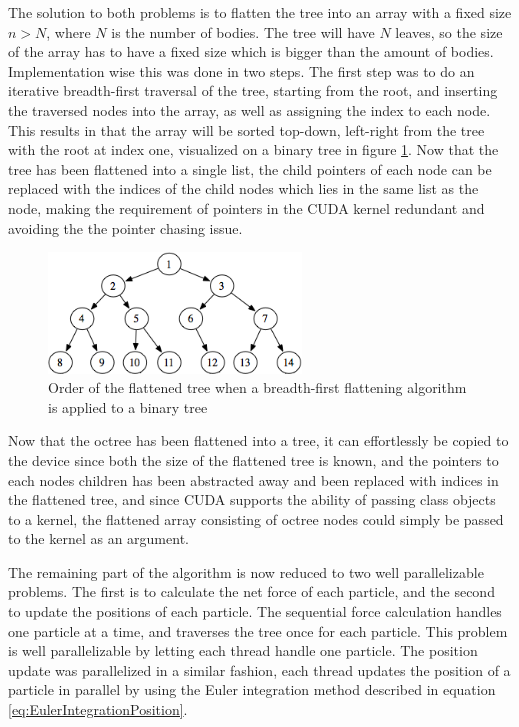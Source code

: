 The solution to both problems is to flatten the tree into an array with a fixed size $n > N$, where $N$ is the number of bodies. The tree will have $N$ leaves, so the size of the array has to have a fixed size which is bigger than the amount of bodies. Implementation wise this was done in two steps.
The first step was to do an iterative breadth-first traversal of the tree, starting from the root, and inserting the traversed nodes into the array, as well as assigning the index to each node. This results in that the array will be sorted top-down, left-right from the tree with the root at index one, visualized on a binary tree in figure \ref{fig:BreadthFirstTreeIndices}. Now that the tree has been flattened into a single list, the child pointers of each node can be replaced with the indices of the child nodes which lies in the same list as the node, making the requirement of pointers in the CUDA kernel redundant and avoiding the the pointer chasing issue.

\begin{figure}[!h]
    \centering
    \includegraphics[width=0.6\textwidth]{Method/Figs/breadthFirstTree.png}
    \caption{Order of the flattened tree when a breadth-first flattening algorithm is applied to a binary tree}
    \label{fig:BreadthFirstTreeIndices}
\end{figure}

Now that the octree has been flattened into a tree, it can effortlessly be copied to the device since both the size of the flattened tree is known, and the pointers to each nodes children has been abstracted away and been replaced with indices in the flattened tree, and since CUDA supports the ability of passing class objects to a kernel, the flattened array consisting of octree nodes could simply be passed to the kernel as an argument. 

The remaining part of the algorithm is now reduced to two well parallelizable problems. The first is to calculate the net force of each particle, and the second to update the positions of each particle. The sequential force calculation handles one particle at a time, and traverses the tree once for each particle. This problem is well parallelizable by letting each thread handle one particle. The position update was parallelized in a similar fashion, each thread updates the position of a particle in parallel by using the Euler integration method described in equation \ref{eq:EulerIntegrationPosition}.

